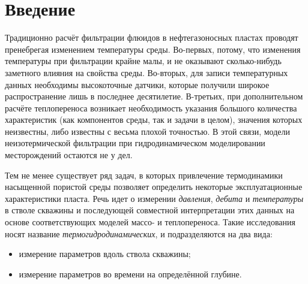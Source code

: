\section*{Введение}
\setcounter{subsection}{0}
	
	Традиционно расчёт фильтрации флюидов в нефтегазоносных пластах проводят пренебрегая изменением температуры среды. Во-первых, потому, что изменения температуры при фильтрации крайне малы, и не оказывают сколько-нибудь заметного влияния на свойства среды. Во-вторых, для записи температурных данных необходимы высокоточные датчики, которые получили широкое распространение лишь в последнее десятилетие. В-третьих, при дополнительном расчёте теплопереноса возникает необходимость указания большого количества характеристик (как компонентов среды, так и задачи в целом), значения которых неизвестны, либо известны с весьма плохой точностью. В этой связи, модели неизотермической фильтрации при гидродинамическом моделировании месторождений остаются не у дел.

	Тем не менее существует ряд задач, в которых привлечение термодинамики насыщенной пористой среды позволяет определить некоторые эксплуатационные характеристики пласта. Речь идет о измерении \textit{давления}, \textit{дебита} и \textit{температуры} в стволе скважины и последующей совместной интерпретации этих данных на основе соответствующих моделей массо- и теплопереноса.
Такие исследования носят название \textit{термогидродинамических}, и подразделяются на два вида:
\begin{itemize}
	\item измерение параметров вдоль ствола скважины;
	\item измерение параметров во времени на определённой глубине.
\end{itemize}